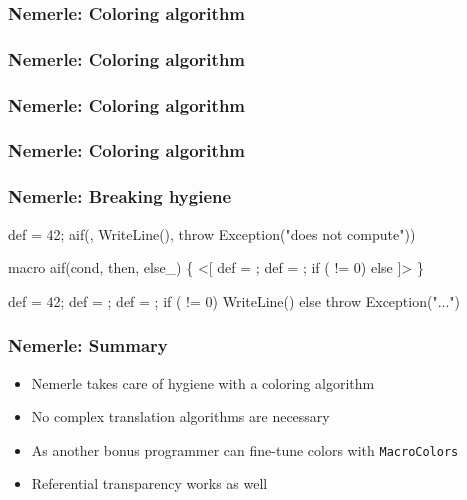 \documentclass[hyperref={bookmarks=false}]{beamer}
\begin{document}
\begin{frame}[fragile]
\frametitle<1>{Nemerle: Coloring algorithm}
\frametitle<2>{Nemerle: Coloring algorithm}%
\frametitle<3>{Nemerle: Coloring algorithm}%
\frametitle<4>{Nemerle: Coloring algorithm}%
\frametitle<5>{Nemerle: Breaking hygiene}%
\begin{semiverbatim}
def  = 42;                 
aif(,
  WriteLine(),
  throw Exception("does not compute"))

macro aif(cond, then, else_) \{      
  <[
    def  = ;
    def  = ;    
    if ( != 0)  else 
  ]>
\}

def  = 42;                 
def  = ;
def  = ;
if ( != 0) WriteLine() else throw Exception("...")
\end{semiverbatim}
\end{frame}

\begin{frame}[fragile]
\frametitle{Nemerle: Summary}
\begin{itemize}
\item Nemerle takes care of hygiene with a coloring algorithm
\item No complex translation algorithms are necessary
\item As another bonus programmer can fine-tune colors with \texttt{MacroColors}
\item Referential transparency works as well
\end{itemize}
\end{frame}
\end{document}
